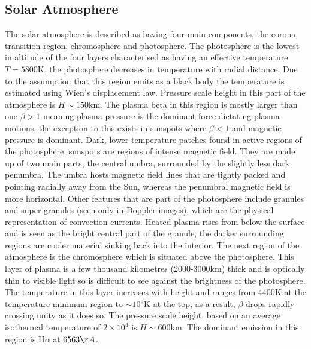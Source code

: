 \subsection{Solar Atmosphere}\label{ATM}
The solar atmosphere \citep{2003dysu.book.....D, 2004soas.book.....F} is described as having four main components, the corona, transition region, chromosphere and photosphere. The photosphere is the lowest in altitude of the four layers characterised as having an effective temperature $T=5800$K, the photosphere decreases in temperature with radial distance. Due to the assumption that this region emits as a black body the temperature is estimated using Wien's displacement law. Pressure scale height in this part of the atmosphere is $H\sim150$km. The plasma beta in this region is mostly larger than one $\beta >1$ meaning plasma pressure is the dominant force dictating plasma motions, the exception to this exists in sunspots where $\beta<1$ and magnetic pressure is dominant. Dark, lower temperature patches found in active regions of the photosphere, sunspots are regions of intense magnetic field. They are made up of two main parts, the central umbra, surrounded by the slightly less dark penumbra. The umbra hosts magnetic field lines that are tightly packed and pointing radially away from the Sun, whereas the penumbral magnetic field is more horizontal. Other features that are part of the photosphere include granules and super granules (seen only in Doppler images), which are the physical representation of convection currents. Heated plasma rises from below the surface and is seen as the bright central part of the granule, the darker surrounding regions are cooler material sinking back into the interior. The next region of the atmosphere is the chromosphere which is situated above the photosphere. This layer of plasma is a few thousand kilometres (2000-3000km) thick and is optically thin to visible light so is difficult to see against the brightness of the photosphere. The temperature in this layer increases with height and ranges from 4400K at the temperature minimum region to $\sim10^{5}$K at the top, as a result, $\beta$ drops rapidly crossing unity as it does so. The pressure scale height, based on an average isothermal temperature of $2\times10^{4}$ is $H\sim600$km. The dominant emission in this region is H$\alpha$ at $6563\AA$.


